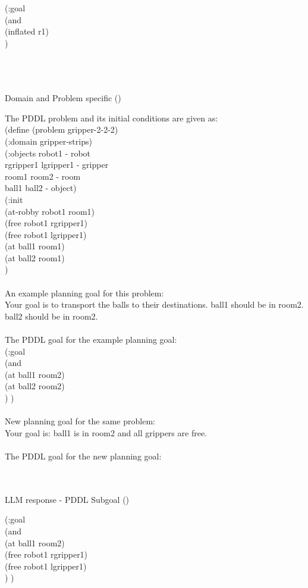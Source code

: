 \begin{tcolorbox}[greenbox]
\begin{minipage}{0.95\columnwidth}
(:goal \\
(and \\
(inflated r1) \\
)
\end{minipage}
\end{tcolorbox} \\ \\ \\
\noindent
Domain and Problem specific (\gripper) \\
\begin{tcolorbox}[redbox]
\begin{minipage}{0.95\columnwidth}
The PDDL problem and its initial conditions are given as: \\
(define (problem gripper-2-2-2)\\
(:domain gripper-strips)\\
(:objects robot1 - robot\\
rgripper1 lgripper1 - gripper\\
room1 room2 - room\\
ball1 ball2 - object)\\
(:init\\
(at-robby robot1 room1)\\
(free robot1 rgripper1)\\
(free robot1 lgripper1)\\
(at ball1 room1)\\
(at ball2 room1)\\
) 
\\ \\
An example planning goal for this problem:  \\
Your goal is to transport the balls to their destinations. 
ball1 should be in room2. 
ball2 should be in room2. 
\\ \\
The PDDL goal for the example planning goal:  \\
(:goal\\
(and\\
(at ball1 room2)\\
(at ball2 room2)\\
)
) 
\\ \\
New planning goal for the same problem:\\
 Your goal is: ball1 is in room2 and all grippers are free. 
\\ \\
The PDDL goal for the new planning goal:
\end{minipage}
\end{tcolorbox} \\ \\
LLM response - PDDL Subgoal (\gripper) \\
\begin{tcolorbox}[greenbox]
\begin{minipage}{0.95\columnwidth}
(:goal \\
(and \\
(at ball1 room2)\\
(free robot1 rgripper1)\\
(free robot1 lgripper1)\\
)
)
\end{minipage}
\end{tcolorbox} \\ \\
